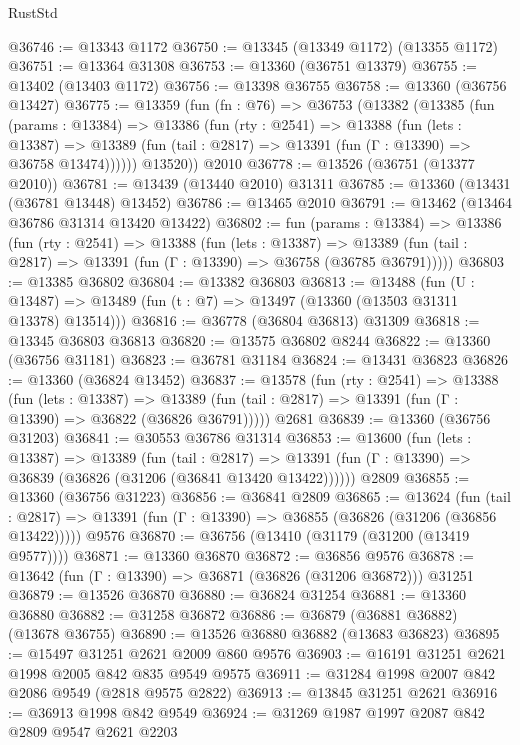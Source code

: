 \begin{lexlean}{RustStd}
\begin{coremodule}
@36746 := @13343 @1172
@36750 := @13345 (@13349 @1172) (@13355 @1172)
@36751 := @13364 @31308
@36753 := @13360 (@36751 @13379)
@36755 := @13402 (@13403 @1172)
@36756 := @13398 @36755
@36758 := @13360 (@36756 @13427)
@36775 := @13359
    (fun (fn : @76) =>
    @36753
      (@13382
        (@13385
          (fun (params : @13384) =>
          @13386
            (fun (rty : @2541) =>
            @13388
              (fun (lets : @13387) =>
              @13389 (fun (tail : @2817) => @13391 (fun (Γ : @13390) => @36758 @13474))))))
        @13520))
    @2010
@36778 := @13526 (@36751 (@13377 @2010))
@36781 := @13439 (@13440 @2010) @31311
@36785 := @13360 (@13431 (@36781 @13448) @13452)
@36786 := @13465 @2010
@36791 := @13462 (@13464 @36786 @31314 @13420 @13422)
@36802 := fun (params : @13384) =>
  @13386
    (fun (rty : @2541) =>
    @13388
      (fun (lets : @13387) =>
      @13389 (fun (tail : @2817) => @13391 (fun (Γ : @13390) => @36758 (@36785 @36791)))))
@36803 := @13385 @36802
@36804 := @13382 @36803
@36813 := @13488
    (fun (U : @13487) => @13489 (fun (t : @7) => @13497 (@13360 (@13503 @31311 @13378) @13514)))
@36816 := @36778 (@36804 @36813) @31309
@36818 := @13345 @36803 @36813
@36820 := @13575 @36802 @8244
@36822 := @13360 (@36756 @31181)
@36823 := @36781 @31184
@36824 := @13431 @36823
@36826 := @13360 (@36824 @13452)
@36837 := @13578
    (fun (rty : @2541) =>
    @13388
      (fun (lets : @13387) =>
      @13389 (fun (tail : @2817) => @13391 (fun (Γ : @13390) => @36822 (@36826 @36791)))))
    @2681
@36839 := @13360 (@36756 @31203)
@36841 := @30553 @36786 @31314
@36853 := @13600
    (fun (lets : @13387) =>
    @13389
      (fun (tail : @2817) =>
      @13391 (fun (Γ : @13390) => @36839 (@36826 (@31206 (@36841 @13420 @13422))))))
    @2809
@36855 := @13360 (@36756 @31223)
@36856 := @36841 @2809
@36865 := @13624
    (fun (tail : @2817) => @13391 (fun (Γ : @13390) => @36855 (@36826 (@31206 (@36856 @13422)))))
    @9576
@36870 := @36756 (@13410 (@31179 (@31200 (@13419 @9577))))
@36871 := @13360 @36870
@36872 := @36856 @9576
@36878 := @13642 (fun (Γ : @13390) => @36871 (@36826 (@31206 @36872))) @31251
@36879 := @13526 @36870
@36880 := @36824 @31254
@36881 := @13360 @36880
@36882 := @31258 @36872
@36886 := @36879 (@36881 @36882) (@13678 @36755)
@36890 := @13526 @36880 @36882 (@13683 @36823)
@36895 := @15497 @31251 @2621 @2009 @860 @9576
@36903 := @16191 @31251 @2621 @1998 @2005 @842 @835 @9549 @9575
@36911 := @31284 @1998 @2007 @842 @2086 @9549 (@2818 @9575 @2822)
@36913 := @13845 @31251 @2621
@36916 := @36913 @1998 @842 @9549
@36924 := @31269 @1987 @1997 @2087 @842 @2809 @9547 @2621 @2203

\end{coremodule}
\end{lexlean}
